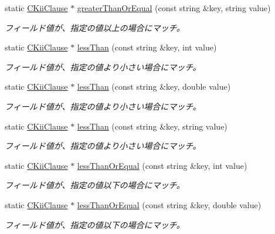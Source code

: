 \begin{DoxyCompactItemize}
static \hyperlink{class_c_kii_clause}{C\-Kii\-Clause} $\ast$ \hyperlink{class_c_kii_clause_ae2041db152cefab9467e783dc3341d56}{greater\-Than\-Or\-Equal} (const string \&key, string value)
\begin{DoxyCompactList}\small\item\em フィールド値が、指定の値以上の場合にマッチ。 \end{DoxyCompactList}\item 
static \hyperlink{class_c_kii_clause}{C\-Kii\-Clause} $\ast$ \hyperlink{class_c_kii_clause_a9392f32670ba0de7cc6dafb6e7dac013}{less\-Than} (const string \&key, int value)
\begin{DoxyCompactList}\small\item\em フィールド値が、指定の値より小さい場合にマッチ。 \end{DoxyCompactList}\item 
static \hyperlink{class_c_kii_clause}{C\-Kii\-Clause} $\ast$ \hyperlink{class_c_kii_clause_a6b58506e76166146c928536229e1b2a0}{less\-Than} (const string \&key, double value)
\begin{DoxyCompactList}\small\item\em フィールド値が、指定の値より小さい場合にマッチ。 \end{DoxyCompactList}\item 
static \hyperlink{class_c_kii_clause}{C\-Kii\-Clause} $\ast$ \hyperlink{class_c_kii_clause_a1e89ae2040a1f8508a0cea15b211cb07}{less\-Than} (const string \&key, string value)
\begin{DoxyCompactList}\small\item\em フィールド値が、指定の値より小さい場合にマッチ。 \end{DoxyCompactList}\item 
static \hyperlink{class_c_kii_clause}{C\-Kii\-Clause} $\ast$ \hyperlink{class_c_kii_clause_a06e219f8b4777aba00ad5d73f75f2f28}{less\-Than\-Or\-Equal} (const string \&key, int value)
\begin{DoxyCompactList}\small\item\em フィールド値が、指定の値以下の場合にマッチ。 \end{DoxyCompactList}\item 
static \hyperlink{class_c_kii_clause}{C\-Kii\-Clause} $\ast$ \hyperlink{class_c_kii_clause_a48a1d60986f9c8d075ccb6b8f1d01292}{less\-Than\-Or\-Equal} (const string \&key, double value)
\begin{DoxyCompactList}\small\item\em フィールド値が、指定の値以下の場合にマッチ。 \end{DoxyCompactList}\item 

\end{DoxyCompactItemize}
